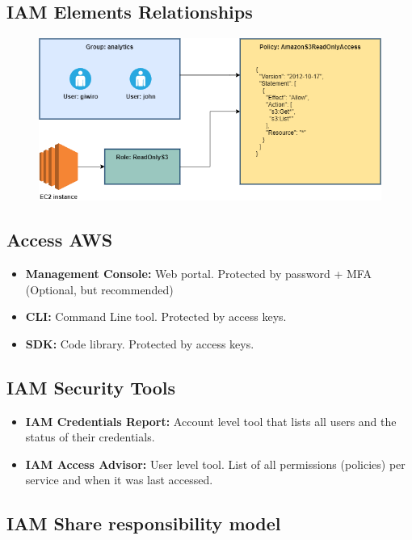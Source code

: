 \subsection{IAM Elements Relationships}\label{subsec:iam-elements-relationships}
\begin{figure}[h]
    \includegraphics[scale=0.5]{iam/iam}
    \centering
    \label{fig:iam-elements-relationships}
\end{figure}

\subsection{Access AWS}\label{subsec:access-aws}
\begin{itemize}
	\item{\textbf{Management Console:}} Web portal.
	    Protected by password + MFA {(Optional, but recommended)}
	\item{\textbf{CLI:}} Command Line tool.
        Protected by access keys.
	\item{\textbf{SDK:}} Code library.
        Protected by access keys.
\end{itemize}

\subsection{IAM Security Tools}\label{subsec:iam-security-tools}
\begin{itemize}
	\item{\textbf{IAM Credentials Report:}} Account level tool that lists all users and the status of their credentials.
    \item{\textbf{IAM Access Advisor:}} User level tool.
        List of all permissions (policies) per service and when it was last accessed.
\end{itemize}

\subsection{IAM Share responsibility model}\label{subsec:iam-share-responsibility-model}


